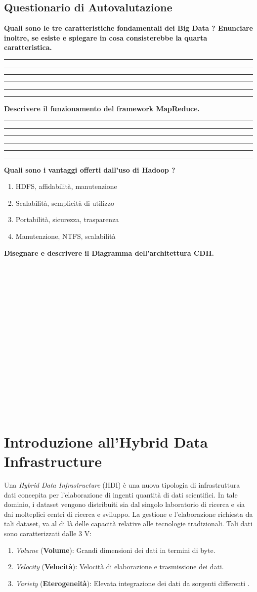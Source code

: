 \documentclass[11pt]{article}
\newcommand{\voceU}[1]{%
	\item #1\dotfill\Square%
}
\begin{document}
\subsection{Questionario di Autovalutazione}
\textbf{Quali sono le tre caratteristiche fondamentali  dei Big Data ? Enunciare inoltre, se esiste e spiegare in cosa consisterebbe la quarta caratteristica.}\\[5ex]
\rule[5mm]{\textwidth}{0.1mm} 
\rule[5mm]{\textwidth}{0.1mm} 
\rule[5mm]{\textwidth}{0.1mm} 
\rule[5mm]{\textwidth}{0.1mm} 
\rule[5mm]{\textwidth}{0.1mm} 
\rule[5mm]{\textwidth}{0.1mm} 
\textbf{Descrivere il funzionamento del framework MapReduce.}\\[5ex]
\rule[5mm]{\textwidth}{0.1mm} 
\rule[5mm]{\textwidth}{0.1mm} 
\rule[5mm]{\textwidth}{0.1mm} 
\rule[5mm]{\textwidth}{0.1mm} 
\rule[5mm]{\textwidth}{0.1mm} 
\rule[5mm]{\textwidth}{0.1mm} 
\textbf{Quali sono i vantaggi offerti dall'uso di Hadoop ?}
\begin{enumerate}
	\voceU{HDFS, affidabilità, manutenzione}
	\voceU{Scalabilità, semplicità di utilizzo}
	\voceU{Portabilità, sicurezza, trasparenza}
	\voceU{Manutenzione, NTFS, scalabilità}\\
\end{enumerate}
\textbf{Disegnare e descrivere il Diagramma dell'architettura CDH.}\\\\\\\\\\\\\\\\\\\\\\\\\\\\\\\\\\
\newpage


\section {Introduzione all'Hybrid Data Infrastructure}
Una \emph{Hybrid Data Infrastructure} (HDI) è una nuova tipologia di infrastruttura dati concepita per l'elaborazione di ingenti quantità di dati scientifici. In tale dominio, i dataset vengono distribuiti sia dal singolo laboratorio di ricerca e sia dai molteplici centri di ricerca e sviluppo. La gestione e l'elaborazione richiesta da tali dataset, va al di là delle capacità relative alle tecnologie tradizionali. Tali dati sono caratterizzati dalle 3 V:
\begin{enumerate}
	\item \emph{Volume} (\textbf{Volume}): Grandi dimensioni dei dati in termini di byte.
	\item \emph{Velocity} (\textbf{Velocità}): Velocità di elaborazione e trasmissione dei dati.
	\item \emph{Variety} (\textbf{Eterogeneità}): Elevata integrazione dei dati da sorgenti differenti \cite{candela2012managing}.
\end{enumerate}
\end{document}
